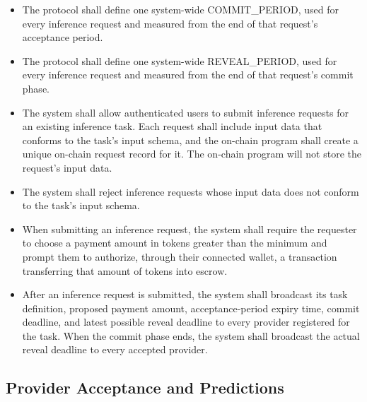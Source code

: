 \documentclass[12pt]{article}
\newcounter{reqnum} %
\begin{document}
\noindent \begin{itemize}

\item[FR\refstepcounter{reqnum}\thereqnum \label{FR_ProtocolCommitPeriod}:] The protocol shall define one system-wide COMMIT\_PERIOD, used for every inference request and measured from the end of that request's acceptance period.

\item[FR\refstepcounter{reqnum}\thereqnum \label{FR_ProtocolRevealPeriod}:] The protocol shall define one system-wide REVEAL\_PERIOD, used for every inference request and measured from the end of that request's commit phase.

\item[FR\refstepcounter{reqnum}\thereqnum \label{FR_RequestSubmission}:] The system shall allow authenticated users to submit inference requests for an existing inference task. Each request shall include input data that conforms to the task's input schema, and the on-chain program shall create a unique on-chain request record for it. The on-chain program will not store the request's input data.

\item[FR\refstepcounter{reqnum}\thereqnum \label{FR_RequestValidation}:] The system shall reject inference requests whose input data does not conform to the task's input schema.

\item[FR\refstepcounter{reqnum}\thereqnum \label{FR_RequestPayment}:] When submitting an inference request, the system shall require the requester to choose a payment amount in tokens greater than the minimum and prompt them to authorize, through their connected wallet, a transaction transferring that amount of tokens into escrow.

\item[FR\refstepcounter{reqnum}\thereqnum \label{FR_RequestBroadcast}:] After an inference request is submitted, the system shall broadcast its task definition, proposed payment amount, acceptance-period expiry time, commit deadline, and latest possible reveal deadline to every provider registered for the task. When the commit phase ends, the system shall broadcast the actual reveal deadline to every accepted provider.

\end{itemize}

\subsection{Provider Acceptance and Predictions}
\end{document}
